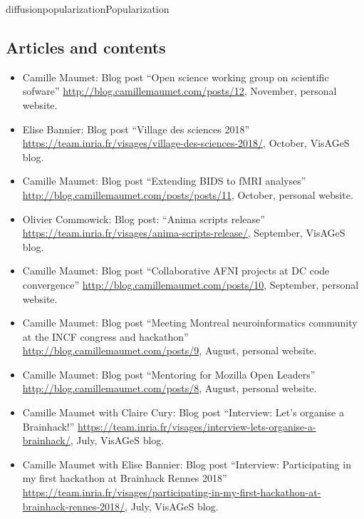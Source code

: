 \documentclass{ra2018}
\begin{document}
\begin{module}{diffusion}{popularization}{Popularization}
\subsection{Articles and contents}
\begin{itemize}
   \item Camille Maumet: Blog post ``Open science working group on scientific sofware'' \url{http://blog.camillemaumet.com/posts/12}, November, personal website. 
   \item Elise Bannier: Blog post ``Village des sciences 2018'' \url{https://team.inria.fr/visages/village-des-sciences-2018/}, October, VisAGeS blog.  
   \item Camille Maumet: Blog post ``Extending BIDS to fMRI analyses'' \url{http://blog.camillemaumet.com/posts/posts/11}, October, personal website. 
   \item Olivier Commowick: Blog post: ``Anima scripts release'' \url{https://team.inria.fr/visages/anima-scripts-release/}, September, VisAGeS blog.
   \item Camille Maumet: Blog post ``Collaborative AFNI projects at DC code convergence'' \url{http://blog.camillemaumet.com/posts/10}, September, personal website. 
   \item Camille Maumet: Blog post ``Meeting Montreal neuroinformatics community at the INCF congress and hackathon'' \url{http://blog.camillemaumet.com/posts/9}, August, personal website. 
   \item Camille Maumet: Blog post ``Mentoring for Mozilla Open Leaders'' \url{http://blog.camillemaumet.com/posts/8}, August, personal website. 
   \item Camille Maumet with Claire Cury: Blog post ``Interview: Let’s organise a Brainhack!'' \url{https://team.inria.fr/visages/interview-lets-organise-a-brainhack/}, July, VisAGeS blog.
   \item Camille Maumet with Elise Bannier: Blog post ``Interview: Participating in my first hackathon at Brainhack Rennes 2018'' \url{https://team.inria.fr/visages/participating-in-my-first-hackathon-at-brainhack-rennes-2018/}, July, VisAGeS blog.

\end{itemize}
\end{module}
\end{document}
